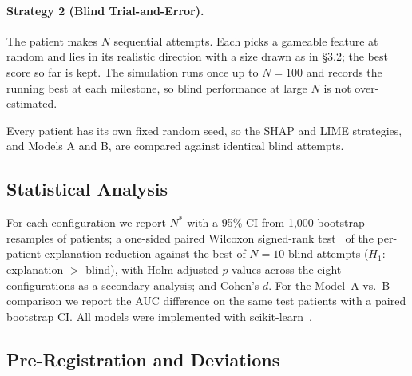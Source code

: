 \documentclass[sigconf,nonacm]{acmart}
\begin{document}
\paragraph{Strategy 2 (Blind Trial-and-Error).}
The patient makes $N$ sequential attempts.  Each picks a gameable
feature at random and lies in its realistic direction with a size
drawn as in \S3.2; the best score so far is kept.  The simulation runs
once up to $N=100$ and records the running best at each milestone, so
blind performance at large $N$ is not over-estimated.

Every patient has its own fixed random seed, so the SHAP and LIME
strategies, and Models A and B, are compared against identical blind
attempts.

\subsection{Statistical Analysis}

For each configuration we report $N^*$ with a 95\% CI from 1{,}000
bootstrap resamples of patients; a one-sided paired Wilcoxon
signed-rank test~\cite{wilcoxon1945individual} of the per-patient
explanation reduction against the best of $N=10$ blind attempts
($H_1$: explanation $>$ blind), with Holm-adjusted $p$-values across the
eight configurations as a secondary analysis; and Cohen's $d$.  For the
Model~A vs.~B comparison we report the AUC difference on the same test
patients with a paired bootstrap CI.  All models were
implemented with scikit-learn~\cite{pedregosa2011sklearn}.

\subsection{Pre-Registration and Deviations}
\label{sec:preregistration}
\end{document}
